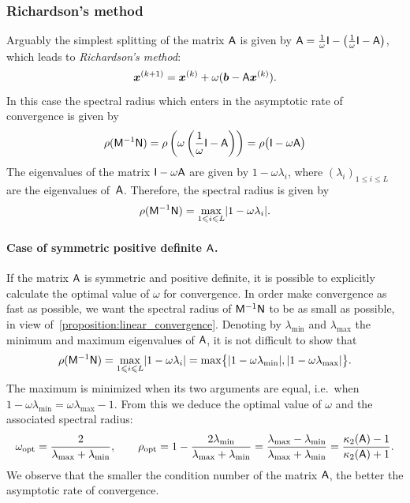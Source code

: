 \subsubsection{Richardson's method}%
\label{ssub:richardson_s_method}

Arguably the simplest splitting of the matrix $\mathsf A$ is given by $\mathsf A = \frac{1}{\omega} \mathsf I - \bigl(\frac{1}{\omega} \mathsf I - \mathsf A\bigr)$,
which leads to \emph{Richardson's method}:
\begin{equation}
    \label{eq:linear_richardson}
    \mathbf{\boldsymbol{x}}^{(k+1)} = \mathbf{\boldsymbol{x}}^{(k)} +  \omega (\mathbf{\boldsymbol{b}} - \mathsf A \mathbf{\boldsymbol{x}}^{(k)}).
\end{equation}
In this case the spectral radius which enters in the asymptotic rate of convergence is given by
\[
    \rho(\mathsf M^{-1} \mathsf N)
    = \rho\left(\omega \left(\frac{1}{\omega} \mathsf I - \mathsf A\right) \right)
    = \rho\bigl( \mathsf I - \omega \mathsf A \bigr)
\]
The eigenvalues of the matrix $\mathsf I - \omega \mathsf A$ are given by $1 - \omega \lambda_i$,
where $(\lambda_i)_{1 \leq i \leq L}$ are the eigenvalues of~$\mathsf A$.
Therefore, the spectral radius is given by
\[
    \rho(\mathsf M^{-1} \mathsf N)
    = \max_{1 \leqslant i \leqslant L} \lvert1  - \omega \lambda_i\rvert.
\]

\paragraph{Case of symmetric positive definite $\mathsf A$.}%
\label{par:case_of_symmetric_positive_definite_mat_a_}
If the matrix $\mathsf A$ is symmetric and positive definite,
it is possible to explicitly calculate the optimal value of $\omega$ for convergence.
In order make convergence as fast as possible,
we want the spectral radius of $\mathsf M^{-1} \mathsf N$ to be as small as possible,
in view of~\cref{proposition:linear_convergence}.
Denoting by $\lambda_{\min}$ and $\lambda_{\max}$ the minimum and maximum eigenvalues of $\mathsf A$,
it is not difficult to show that
\[
    \rho(\mathsf M^{-1} \mathsf N)
    = \max_{1 \leqslant i \leqslant L} \lvert1  - \omega \lambda_i\rvert
    = \max \bigl\{ \lvert1 - \omega \lambda_{\min}\rvert, \lvert1 - \omega \lambda_{\max}\rvert\bigr\}.
\]
The maximum is minimized when its two arguments are equal,
i.e.\ when $1 - \omega \lambda_{\min} = \omega \lambda_{\max} -1$.
From this we deduce the optimal value of $\omega$ and the associated spectral radius:
\[
    \omega_{\rm opt} = \frac{2}{\lambda_{\max} + \lambda_{\min}},
    \qquad
    \rho_{\rm opt}
    = 1 - \frac{2\lambda_{\min}}{\lambda_{\max} + \lambda_{\min}}
    = \frac{\lambda_{\max} - \lambda_{\min}}{\lambda_{\max} + \lambda_{\min}}
    =  \frac{\kappa_2(\mathsf A) - 1}{\kappa_2(\mathsf A) + 1}.
\]
We observe that the smaller the condition number of the matrix $\mathsf A$,
the better the asymptotic rate of convergence.


